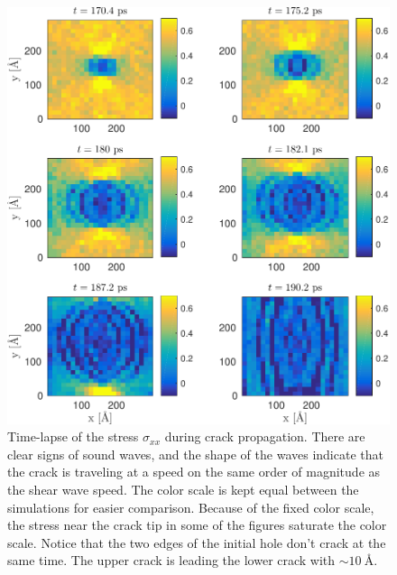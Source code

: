 \begin{figure}
\includegraphics[width=\textwidth]{../figures/thesis/stressfield_timelapse.pdf}
\caption{Time-lapse of the stress $\sigma_{xx}$ during crack propagation. There are clear signs of sound waves, and the shape of the waves indicate that the crack is traveling at a speed on the same order of magnitude as the shear wave speed. The color scale is kept equal between the simulations for easier comparison. Because of the fixed color scale, the stress near the crack tip in some of the figures saturate the color scale. Notice that the two edges of the initial hole don't crack at the same time. The upper crack is leading the lower crack 
with $\sim \SI{10}{\angstrom}$. }
\label{fig:stressfield_timelapse}
\end{figure}




